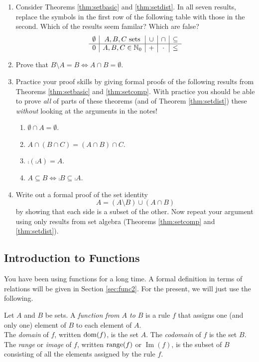 \begin{exercises}{}{}
\begin{enumerate}
	\item Consider Theorems \ref{thm:setbasic} and \ref{thm:setdist}. In all seven results, replace the symbols in the first row of the following table with those in the second. Which of the results seem familar? Which are false?
\[\begin{array}{c|c|c|c|c}
\emptyset&A,B,C\text{ sets}&\cup&\cap&\subseteq\\\hline
0&A,B,C\in\mathbb{N}_0&+&\cdot&\le
\end{array}\]

	\item Prove that $B\setminus A=B\iff A\cap B=\emptyset$.
	
	\item Practice your proof skills by giving formal proofs of the following results from Theorems \ref{thm:setbasic} and \ref{thm:setcomp}. With practice you should be able to prove \emph{all} of parts of these theorems (and of Theorem \ref{thm:setdist}) these \emph{without} looking at the arguments in the notes!
	\begin{enumerate}
	  \item $\emptyset\cap A=\emptyset$.
		\item $A\cap (B\cap C)=(A\cap B)\cap C$.
		\item $\comp{(\comp A)}=A$.
		\item $A\subseteq B\iff \comp B\subseteq \comp A$.
	\end{enumerate}

	\item Write out a formal proof of the set identity
	\[A=(A\setminus B)\cup (A\cap B)\]
	by showing that each side is a subset of the other. Now repeat your argument using only results from set algebra (Theorems \ref{thm:setcomp} and \ref{thm:setdist}).
\end{enumerate}

\end{exercises}
\clearpage


\subsection{Introduction to Functions}\label{sec:func1}

You have been using functions for a long time. A formal definition in terms of relations will be given in Section \ref{sec:func2}. For the present, we will just use the following.

\begin{defn}{}{}
Let $A$ and $B$ be sets. A \emph{function from $A$ to $B$} is a rule $f$ that assigns one (and only one) element of $B$ to each element of $A$.\\
The \emph{domain} of $f$, written $\operatorname{dom}(f)$, is the set $A$. The \emph{codomain} of $f$ is the set $B$.\\
The \emph{range} or \emph{image} of $f$, written $\operatorname{range}(f)$ or $\operatorname{Im}(f)$, is the subset of $B$ consisting of all the elements assigned by the rule $f$.
\end{defn}

